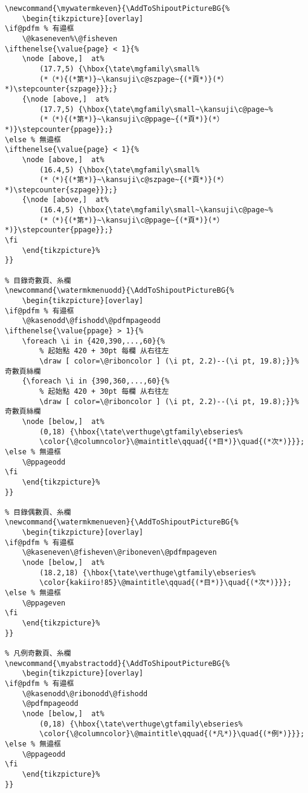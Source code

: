 \begin{lstlisting}[firstnumber=541]
% pagestyle my 偶數頁、無糸欄、垂直頁碼、無標題
\newcommand{\mywatermkeven}{\AddToShipoutPictureBG{%
	\begin{tikzpicture}[overlay]
\if@pdfm % 有邉框
	\@kaseneven%\@fisheven
\ifthenelse{\value{page} < 1}{%
	\node [above,]  at%
		(17.7,5) {\hbox{\tate\mgfamily\small%
		(*（*){(*第*)}~\kansuji\c@szpage~{(*頁*)}(*）*)\stepcounter{szpage}}};}
	{\node [above,]  at%
		(17.7,5) {\hbox{\tate\mgfamily\small~\kansuji\c@page~%
		(*（*){(*第*)}~\kansuji\c@ppage~{(*頁*)}(*）*)}\stepcounter{ppage}};}
\else % 無邉框
\ifthenelse{\value{page} < 1}{%
	\node [above,]  at%
		(16.4,5) {\hbox{\tate\mgfamily\small%
		(*（*){(*第*)}~\kansuji\c@szpage~{(*頁*)}(*）*)\stepcounter{szpage}}};}
	{\node [above,]  at%
		(16.4,5) {\hbox{\tate\mgfamily\small~\kansuji\c@page~%
		(*（*){(*第*)}~\kansuji\c@ppage~{(*頁*)}(*）*)}\stepcounter{ppage}};}
\fi
	\end{tikzpicture}%
}}

% 目錄奇數頁、糸欄
\newcommand{\watermkmenuodd}{\AddToShipoutPictureBG{%
	\begin{tikzpicture}[overlay]
\if@pdfm % 有邉框
	\@kasenodd\@fishodd\@pdfmpageodd
\ifthenelse{\value{ppage} > 1}{%
	\foreach \i in {420,390,...,60}{%
		% 起始點 420 + 30pt 每欄 从右往左
		\draw [ color=\@riboncolor ] (\i pt, 2.2)--(\i pt, 19.8);}}% 奇數頁絲欄 
	{\foreach \i in {390,360,...,60}{%
		% 起始點 420 + 30pt 每欄 从右往左
		\draw [ color=\@riboncolor ] (\i pt, 2.2)--(\i pt, 19.8);}}% 奇數頁絲欄 
	\node [below,]  at%
		(0,18) {\hbox{\tate\verthuge\gtfamily\ebseries%
		\color{\@columncolor}\@maintitle\qquad{(*目*)}\quad{(*次*)}}};
\else % 無邉框
	\@ppageodd
\fi
	\end{tikzpicture}%
}}

% 目錄偶數頁、糸欄
\newcommand{\watermkmenueven}{\AddToShipoutPictureBG{%
	\begin{tikzpicture}[overlay]
\if@pdfm % 有邉框
	\@kaseneven\@fisheven\@riboneven\@pdfmpageven
	\node [below,]  at%
		(18.2,18) {\hbox{\tate\verthuge\gtfamily\ebseries%
		\color{kakiiro!85}\@maintitle\qquad{(*目*)}\quad{(*次*)}}};
\else % 無邉框
	\@ppageven
\fi
	\end{tikzpicture}%
}}

% 凡例奇數頁、糸欄
\newcommand{\myabstractodd}{\AddToShipoutPictureBG{%
	\begin{tikzpicture}[overlay]
\if@pdfm % 有邉框
	\@kasenodd\@ribonodd\@fishodd
	\@pdfmpageodd
	\node [below,]  at%
		(0,18) {\hbox{\tate\verthuge\gtfamily\ebseries%
		\color{\@columncolor}\@maintitle\qquad{(*凡*)}\quad{(*例*)}}};
\else % 無邉框
	\@ppageodd
\fi
	\end{tikzpicture}%
}}


\end{lstlisting}
